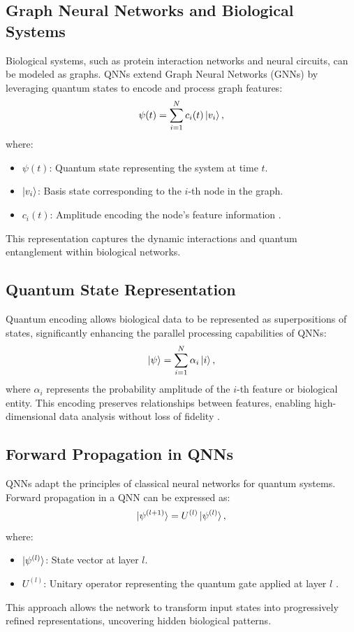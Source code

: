 \documentclass{article}
\theoremstyle{plain}
\begin{document}
\subsection{Graph Neural Networks and Biological Systems}
Biological systems, such as protein interaction networks and neural circuits, can be modeled as graphs. QNNs extend Graph Neural Networks (GNNs) by leveraging quantum states to encode and process graph features:
\begin{equation}
\psi(t) = \sum_{i=1}^{N} c_i(t) \ket{v_i},
\end{equation}
where:
\begin{itemize}
    \item $\psi(t)$: Quantum state representing the system at time $t$.
    \item $\ket{v_i}$: Basis state corresponding to the $i$-th node in the graph.
    \item $c_i(t)$: Amplitude encoding the node's feature information \cite{gnnQuantum2023}.
\end{itemize}
This representation captures the dynamic interactions and quantum entanglement within biological networks.

\subsection{Quantum State Representation}
Quantum encoding allows biological data to be represented as superpositions of states, significantly enhancing the parallel processing capabilities of QNNs:
\begin{equation}
\ket{\psi} = \sum_{i=1}^{N} \alpha_i \ket{i},
\end{equation}
where $\alpha_i$ represents the probability amplitude of the $i$-th feature or biological entity. This encoding preserves relationships between features, enabling high-dimensional data analysis without loss of fidelity \cite{quantumRepresentation2022}.

\subsection{Forward Propagation in QNNs}
QNNs adapt the principles of classical neural networks for quantum systems. Forward propagation in a QNN can be expressed as:
\begin{equation}
\ket{\psi^{(l+1)}} = U^{(l)} \ket{\psi^{(l)}},
\end{equation}
where:
\begin{itemize}
    \item $\ket{\psi^{(l)}}$: State vector at layer $l$.
    \item $U^{(l)}$: Unitary operator representing the quantum gate applied at layer $l$ \cite{qnnForward2023}.
\end{itemize}
This approach allows the network to transform input states into progressively refined representations, uncovering hidden biological patterns.
\end{document}
